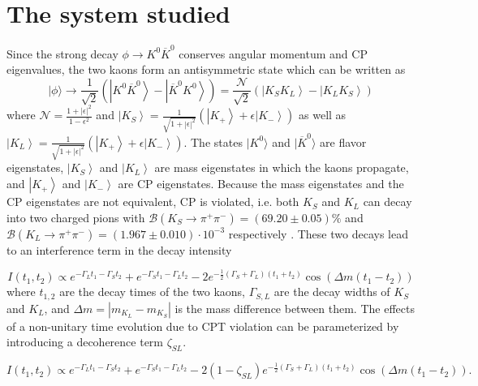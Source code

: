 
\section{The system studied}
Since the strong decay $\phi \rightarrow K^0 \overline{K}^0$ conserves angular momentum and CP eigenvalues, the two kaons form an antisymmetric state which can be written as %
\begin{equation}
|\phi\rangle \rightarrow \frac{1}{\sqrt{2}}\left(\left|K^0 \overline{K}^0\right\rangle - \left| \overline{K}^0K^0\right\rangle\right) = \frac{\mathcal{N}}{\sqrt{2}} \left(\left|K_SK_L\right\rangle - \left|K_LK_S\right\rangle\right)
\end{equation}
where $\mathcal{N} = \frac{1+|\epsilon|^2}{1-\epsilon^2}$ and $\left|K_S\right\rangle = \frac{1}{\sqrt{1+|\epsilon|^2}}\left(\left|K_+\right\rangle + \epsilon \left| K_-\right\rangle\right)$ as well as $\left|K_L\right\rangle = \frac{1}{\sqrt{1+|\epsilon|^2}}\left(\left|K_+\right\rangle + \epsilon \left| K_-\right\rangle\right)$. The states $|K^0\rangle$ and $|\overline{K}^0\rangle$ are flavor eigenstates, $\left|K_S\right\rangle$ and $\left|K_L\right\rangle$ are mass eigenstates in which the kaons propagate, and $\left|K_+\right\rangle$ and $\left|K_-\right\rangle$ are CP eigenstates. Because the mass eigenstates and the CP eigenstates are not equivalent, CP is violated, i.e. both $K_S$ and $K_L$ can decay into two charged pions with $\mathcal{B}(K_S \rightarrow \pi^+ \pi^-) = (69.20\pm0.05)\%$ and $\mathcal{B}(K_L \rightarrow \pi^+ \pi^-) = (1.967\pm0.010)\cdot 10^{-3}$ respectively \cite{Agashe:2014kda}.  These two decays lead to an interference term in the decay intensity

\begin{equation}
I(t_1,t_2) \propto  e^{-\Gamma_L t_1 - \Gamma_S t_2} +e^{-\Gamma_S t_1 - \Gamma_L t_2}- 2 e^{-\frac{1}{2}\left(\Gamma_S + \Gamma_L\right)\left(t_1+t_2\right)}\cos\left(\Delta m \left(t_1-t_2\right)\right) \label{EQ:DI1}
\end{equation}
where $t_{1,2}$ are the decay times of the two kaons, $\Gamma_{S,L}$ are the decay widths of $K_S$ and $K_L$, and $\Delta m = \left|m_{K_L} - m_{K_S}\right|$ is the mass difference between them. The effects of a non-unitary time evolution due to CPT violation can be parameterized by introducing a decoherence term $\zeta_{SL}$\cite{Balwierz-Pytko:2013xsa}.

\begin{equation}
I(t_1,t_2) \propto  e^{-\Gamma_L t_1 - \Gamma_S t_2} +e^{-\Gamma_S t_1 - \Gamma_L t_2}- 2(1-\zeta_{SL}) e^{-\frac{1}{2}\left(\Gamma_S + \Gamma_L\right)\left(t_1+t_2\right)}\cos\left(\Delta m \left(t_1-t_2\right)\right). \label{EQ:DI2}
\end{equation}

